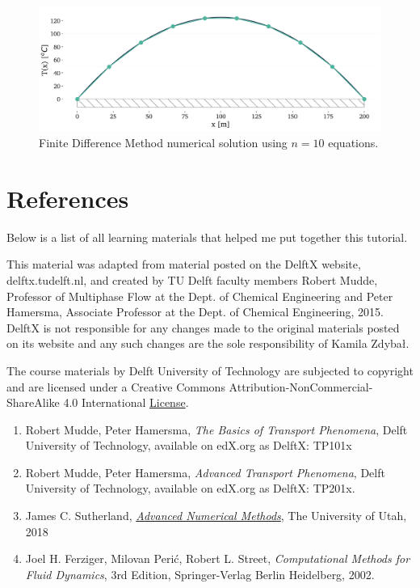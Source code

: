 \documentclass[20pt]{report}
\begin{document}
\begin{figure}[H]
\centering\includegraphics[width=12cm]{plots/example-heat-transfer-in-a-rod-FDM-n10.png}
\caption{Finite Difference Method numerical solution using $n=10$ equations.}
\label{fig:FDM-solution}
\end{figure}

\section*{References}

Below is a list of all learning materials that helped me put together this tutorial.

This material was adapted from material posted on the DelftX website, delftx.tudelft.nl, and created by TU Delft faculty members Robert Mudde, Professor of Multiphase Flow at the Dept. of Chemical Engineering and Peter Hamersma, Associate Professor at the Dept. of Chemical Engineering, 2015. DelftX is not responsible for any changes made to the original materials posted on its website and any such changes are the sole responsibility of Kamila Zdybał.

The course materials by Delft University of Technology are subjected to copyright and are licensed under a Creative Commons Attribution-NonCommercial-ShareAlike 4.0 International \href{https://creativecommons.org/licenses/by-nc-sa/4.0/}{License}.

\begin{enumerate}
\item Robert Mudde, Peter Hamersma, \textit{The Basics of Transport Phenomena}, Delft University of Technology, available on edX.org as DelftX: TP101x
\item Robert Mudde, Peter Hamersma, \textit{Advanced Transport Phenomena}, Delft University of Technology, available on edX.org as DelftX: TP201x.
\item James C. Sutherland, \textit{\href{https://sutherland.che.utah.edu/teaching/chen6703/lectures-schedule/}{Advanced Numerical Methods}}, The University of Utah, 2018
\item Joel H. Ferziger, Milovan Perić, Robert L. Street, \textit{Computational Methods for Fluid Dynamics}, 3rd Edition, Springer-Verlag Berlin Heidelberg, 2002.
\end{enumerate}
\end{document}
